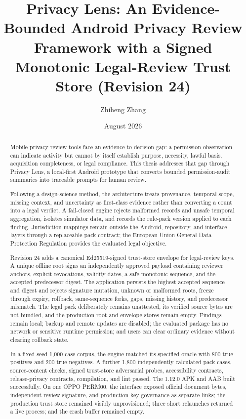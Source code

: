 \documentclass[11pt,a4paper]{article}
\title{Privacy Lens: An Evidence-Bounded Android Privacy Review Framework with a Signed Monotonic Legal-Review Trust Store (Revision 24)}
\author{Zhiheng Zhang}
\date{August 2026}
\begin{document}
\maketitle
\begin{abstract}
\small\singlespacing
Mobile privacy-review tools face an evidence-to-decision gap: a permission observation can indicate activity but cannot by itself establish purpose, necessity, lawful basis, acquisition completeness, or legal compliance. This thesis addresses that gap through Privacy Lens, a local-first Android prototype that converts bounded permission-audit summaries into traceable prompts for human review.

Following a design-science method, the architecture treats provenance, temporal scope, missing context, and uncertainty as first-class evidence rather than converting a count into a legal verdict. A fail-closed engine rejects malformed records and unsafe temporal aggregation, isolates simulator data, and records the rule-pack version applied to each finding. Jurisdiction mappings remain outside the Android, repository, and interface layers through a replaceable pack contract; the European Union General Data Protection Regulation provides the evaluated legal objective.

Revision 24 adds a canonical Ed25519-signed trust-store envelope for legal-review keys. A unique offline root signs an independently approved payload containing reviewer anchors, explicit revocations, validity dates, a safe monotonic sequence, and the accepted predecessor digest. The application persists the highest accepted sequence and digest and rejects signature mutation, unknown or malformed roots, freeze through expiry, rollback, same-sequence forks, gaps, missing history, and predecessor mismatch. The legal pack deliberately remains unattested, its verified source bytes are not bundled, and the production root and envelope stores remain empty. Findings remain local; backup and remote updates are disabled; the evaluated package has no network or sensitive runtime permission; and users can clear ordinary evidence without clearing rollback state.

In a fixed-seed 1,000-case corpus, the engine matched its specified oracle with 800 true positives and 200 true negatives. A further 1,800 independently calculated pack cases, source-content checks, signed trust-store adversarial probes, accessibility contracts, release-privacy contracts, compilation, and lint passed. The 1.12.0 APK and AAB built successfully. On one OPPO PERM00, the interface exposed official document bytes, independent review signature, and production key governance as separate links; the production trust store remained visibly unprovisioned; three short relaunches returned a live process; and the crash buffer remained empty.


\end{abstract}
\end{document}
